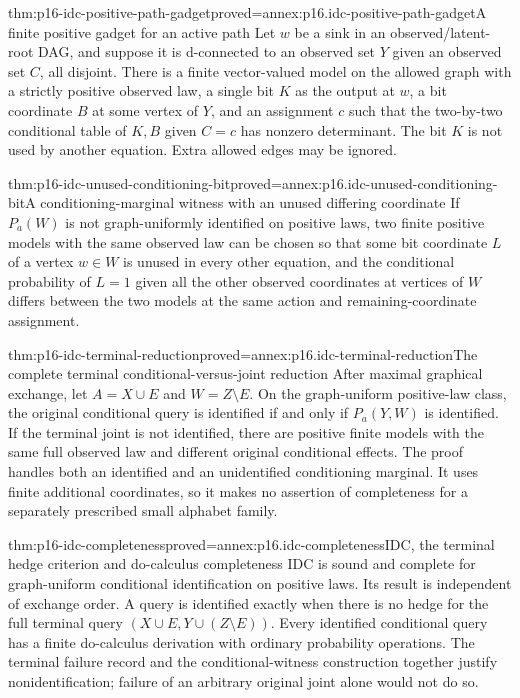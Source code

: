 \begin{hblemma}{thm:p16-idc-positive-path-gadget}{proved=annex:p16.idc-positive-path-gadget}{A finite positive gadget for an active path}
Let \(w\) be a sink in an observed/latent-root DAG, and suppose
it is d-connected to an observed set \(Y\) given an observed
set \(C\), all disjoint. There is a finite vector-valued model
on the allowed graph with a strictly positive observed law, a single
bit \(K\) as the output at \(w\), a bit coordinate \(B\)
at some vertex of \(Y\), and an assignment \(c\) such that
the two-by-two conditional table of \(K,B\) given \(C=c\)
has nonzero determinant. The bit \(K\) is not used by another
equation. Extra allowed edges may be ignored.
\end{hblemma}

\begin{hblemma}{thm:p16-idc-unused-conditioning-bit}{proved=annex:p16.idc-unused-conditioning-bit}{A conditioning-marginal witness with an unused differing coordinate}
If \(P_a(W)\) is not graph-uniformly identified on positive
laws, two finite positive models with the same observed law can
be chosen so that some bit coordinate \(L\) of a vertex
\(w\in W\) is unused in every other equation, and the
conditional probability of \(L=1\) given all the other observed
coordinates at vertices of \(W\) differs between the two models
at the same action and remaining-coordinate assignment.
\end{hblemma}

\begin{hbtheorem}{thm:p16-idc-terminal-reduction}{proved=annex:p16.idc-terminal-reduction}{The complete terminal conditional-versus-joint reduction}
After maximal graphical exchange, let \(A=X\cup E\) and
\(W=Z\setminus E\). On the graph-uniform positive-law class,
the original conditional query is identified if and only if
\(P_a(Y,W)\) is identified. If the terminal joint is not
identified, there are positive finite models with the same full
observed law and different original conditional effects. The proof
handles both an identified and an unidentified conditioning marginal.
It uses finite additional coordinates, so it makes no assertion of
completeness for a separately prescribed small alphabet family.
\end{hbtheorem}

\begin{hbcorollary}{thm:p16-idc-completeness}{proved=annex:p16.idc-completeness}{IDC, the terminal hedge criterion and do-calculus completeness}
IDC is sound and complete for graph-uniform conditional identification
on positive laws. Its result is independent of exchange order.
A query is identified exactly when there is no hedge for the full
terminal query \((X\cup E,Y\cup(Z\setminus E))\).
Every identified conditional query has a finite do-calculus derivation
with ordinary probability operations. The terminal failure record and
the conditional-witness construction together justify nonidentification;
failure of an arbitrary original joint alone would not do so.
\end{hbcorollary}

